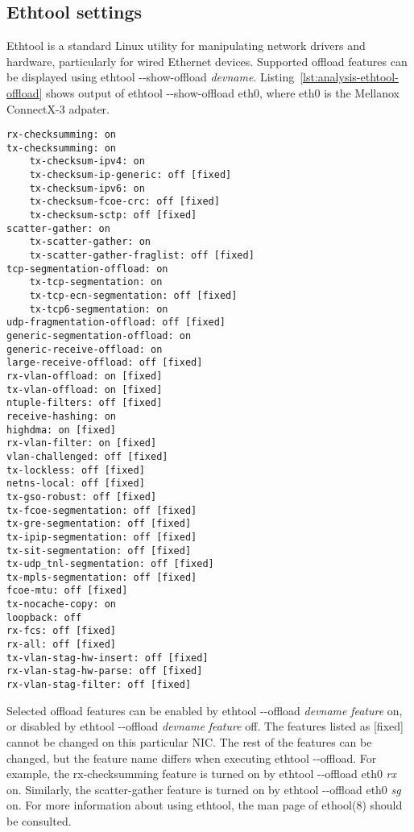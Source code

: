 
\subsection{Ethtool settings}\label{sub:analysis-settings-ethtool}
Ethtool is a standard Linux utility for manipulating network drivers and hardware, particularly for
wired Ethernet devices.
Supported offload features can be displayed using ethtool -{}-show-offload {\it{devname}}.
Listing~\ref{lst:analysis-ethtool-offload} shows output of ethtool -{}-show-offload eth0,
where eth0 is the Mellanox ConnectX-3 adpater.

\begin{lstlisting}[caption={Output of ethtool -{}-show-offload for Mellanox ConnectX3 adapter},label={lst:analysis-ethtool-offload}]
rx-checksumming: on
tx-checksumming: on
	tx-checksum-ipv4: on
	tx-checksum-ip-generic: off [fixed]
	tx-checksum-ipv6: on
	tx-checksum-fcoe-crc: off [fixed]
	tx-checksum-sctp: off [fixed]
scatter-gather: on
	tx-scatter-gather: on
	tx-scatter-gather-fraglist: off [fixed]
tcp-segmentation-offload: on
	tx-tcp-segmentation: on
	tx-tcp-ecn-segmentation: off [fixed]
	tx-tcp6-segmentation: on
udp-fragmentation-offload: off [fixed]
generic-segmentation-offload: on
generic-receive-offload: on
large-receive-offload: off [fixed]
rx-vlan-offload: on [fixed]
tx-vlan-offload: on [fixed]
ntuple-filters: off [fixed]
receive-hashing: on
highdma: on [fixed]
rx-vlan-filter: on [fixed]
vlan-challenged: off [fixed]
tx-lockless: off [fixed]
netns-local: off [fixed]
tx-gso-robust: off [fixed]
tx-fcoe-segmentation: off [fixed]
tx-gre-segmentation: off [fixed]
tx-ipip-segmentation: off [fixed]
tx-sit-segmentation: off [fixed]
tx-udp_tnl-segmentation: off [fixed]
tx-mpls-segmentation: off [fixed]
fcoe-mtu: off [fixed]
tx-nocache-copy: on
loopback: off
rx-fcs: off [fixed]
rx-all: off [fixed]
tx-vlan-stag-hw-insert: off [fixed]
rx-vlan-stag-hw-parse: off [fixed]
rx-vlan-stag-filter: off [fixed]
\end{lstlisting}

Selected offload features can be enabled by ethtool -{}-offload {\it{devname}} {\it{feature}} on,
or disabled by ethtool -{}-offload {\it{devname}} {\it{feature}} off.
The features listed as [fixed] cannot be changed on this particular NIC.
The rest of the features can be changed, but the feature name differs when executing ethtool -{}-offload.
For example, the rx-checksumming feature is turned on by ethtool -{}-offload eth0 {\it{rx}} on.
Similarly, the scatter-gather feature is turned on by ethtool -{}-offload eth0 {\it{sg}} on.
For more information about using ethtool, the man page of ethool(8) should be consulted.

